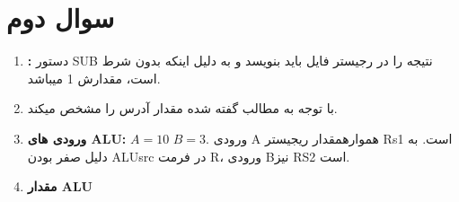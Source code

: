 \documentclass[a4paper,12pt]{article}
\begin{document}
\section{سوال دوم}

\begin{enumerate}
		\item \textbf{:}
		دستور SUB نتیجه را در رجیستر فایل باید بنویسد و به دلیل اینکه بدون شرط است، مقدارش 1 میباشد.
		\item \textbf{}
		با توجه به مطالب گفته شده مقدار  آدرس را مشخص میکند.
		\item \textbf{ورودی های ALU:}
		$A= 10 \, \, B = 3$.
		 ورودی A هموارهمقدار ریجیستر Rs1 است. به دلیل صفر بودن ALUsrc در فرمت R، ورودی B‌نیز RS2 است.
		 \item \textbf{مقدار ALU}
\end{enumerate}
\end{document}
